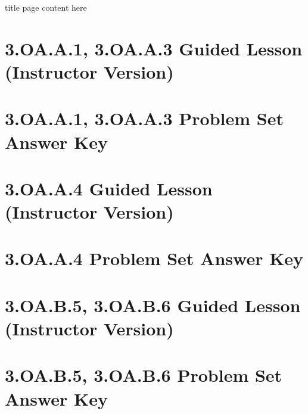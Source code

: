 \documentclass[a4paper,12pt]{article}
\title{}
\date{}
\begin{document}
title page content here
\hypertarget{toc}{}  %
\tableofcontents
\newpage

\pagestyle{fancy}  %

\newpage
\section{3.OA.A.1, 3.OA.A.3 Guided Lesson (Instructor Version)}


\newpage
\section{3.OA.A.1, 3.OA.A.3 Problem Set Answer Key}


\newpage
\section{3.OA.A.4 Guided Lesson (Instructor Version)}


\newpage
\section{3.OA.A.4 Problem Set Answer Key}


\newpage
\section{3.OA.B.5, 3.OA.B.6 Guided Lesson (Instructor Version)}


\newpage
\section{3.OA.B.5, 3.OA.B.6 Problem Set Answer Key}

\end{document}
